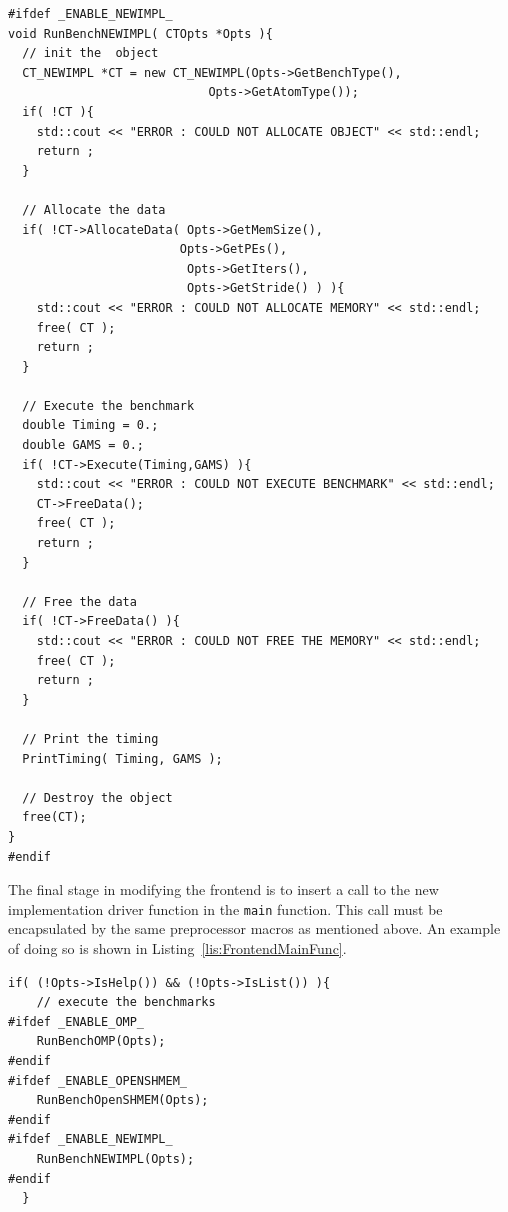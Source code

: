 \documentclass{article}
\begin{document}
\clearpage
\vspace{0.125in}
\begin{lstlisting}[frame=single,style=base,caption={Frontend Driver Function},captionpos=b,label={lis:FrontendDriverFunc}]
#ifdef _ENABLE_NEWIMPL_
void RunBenchNEWIMPL( CTOpts *Opts ){
  // init the  object
  CT_NEWIMPL *CT = new CT_NEWIMPL(Opts->GetBenchType(),
                          	Opts->GetAtomType());
  if( !CT ){
    std::cout << "ERROR : COULD NOT ALLOCATE OBJECT" << std::endl;
    return ;
  }

  // Allocate the data
  if( !CT->AllocateData( Opts->GetMemSize(),
                       	Opts->GetPEs(),
                         Opts->GetIters(),
                         Opts->GetStride() ) ){
    std::cout << "ERROR : COULD NOT ALLOCATE MEMORY" << std::endl;
    free( CT );
    return ;
  }

  // Execute the benchmark
  double Timing = 0.;
  double GAMS = 0.;
  if( !CT->Execute(Timing,GAMS) ){
    std::cout << "ERROR : COULD NOT EXECUTE BENCHMARK" << std::endl;
    CT->FreeData();
    free( CT );
    return ;
  }

  // Free the data
  if( !CT->FreeData() ){
    std::cout << "ERROR : COULD NOT FREE THE MEMORY" << std::endl;
    free( CT );
    return ;
  }

  // Print the timing
  PrintTiming( Timing, GAMS );

  // Destroy the object
  free(CT);
}
#endif
\end{lstlisting}

The final stage in modifying the frontend is to insert a call to the new 
implementation driver function in the \texttt{main} function.  This call 
must be encapsulated by the same preprocessor macros as mentioned 
above.  An example of doing so is shown in Listing~\ref{lis:FrontendMainFunc}.  

\clearpage
\vspace{0.125in}
\begin{lstlisting}[frame=single,style=base,caption={Frontend Main Modifications},captionpos=b,label={lis:FrontendMainFunc}]
 if( (!Opts->IsHelp()) && (!Opts->IsList()) ){
    // execute the benchmarks
#ifdef _ENABLE_OMP_
    RunBenchOMP(Opts);
#endif
#ifdef _ENABLE_OPENSHMEM_
    RunBenchOpenSHMEM(Opts);
#endif
#ifdef _ENABLE_NEWIMPL_
    RunBenchNEWIMPL(Opts);
#endif
  }
\end{lstlisting}


\clearpage
%
%


\end{document}
